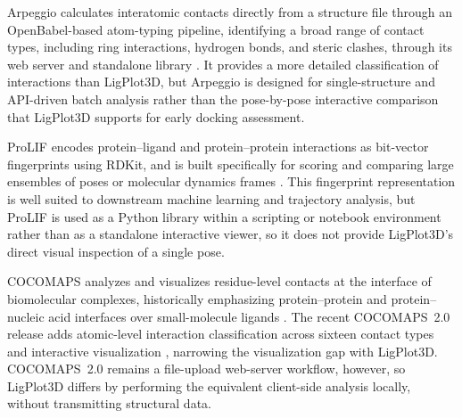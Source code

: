 \documentclass[journal=jacsat,manuscript=article]{achemso}
\begin{document}
Arpeggio calculates interatomic contacts directly from a structure file through an OpenBabel-based atom-typing pipeline, identifying a broad range of contact types, including ring interactions, hydrogen bonds, and steric clashes, through its web server and standalone library \cite{jubb2017arpeggio}. It provides a more detailed classification of interactions than LigPlot3D, but Arpeggio is designed for single-structure and API-driven batch analysis rather than the pose-by-pose interactive comparison that LigPlot3D supports for early docking assessment.


ProLIF encodes protein--ligand and protein--protein interactions as bit-vector fingerprints using RDKit, and is built specifically for scoring and comparing large ensembles of poses or molecular dynamics frames \cite{bouysset2021prolif}. This fingerprint representation is well suited to downstream machine learning and trajectory analysis, but ProLIF is used as a Python library within a scripting or notebook environment rather than as a standalone interactive viewer, so it does not provide LigPlot3D's direct visual inspection of a single pose.

COCOMAPS analyzes and visualizes residue-level contacts at the interface of biomolecular complexes, historically emphasizing protein--protein and protein--nucleic acid interfaces over small-molecule ligands \cite{vangone2011cocomaps}. The recent COCOMAPS~2.0 release adds atomic-level interaction classification across sixteen contact types and interactive visualization \cite{chawla2025cocomaps2}, narrowing the visualization gap with LigPlot3D. COCOMAPS~2.0 remains a file-upload web-server workflow, however, so LigPlot3D differs by performing the equivalent client-side analysis locally, without transmitting structural data.

\begin{table}[H]
\centering
\caption{Deployment model and typical use case across interaction analysis tools.}
\label{tab:comparison}
\end{table}
\end{document}
